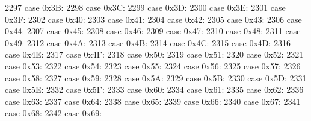 \begin{DoxyCode}
2297                 \textcolor{keywordflow}{case} 0x3B:
2298                 \textcolor{keywordflow}{case} 0x3C:
2299                 \textcolor{keywordflow}{case} 0x3D:
2300                 \textcolor{keywordflow}{case} 0x3E:
2301                 \textcolor{keywordflow}{case} 0x3F:
2302                 \textcolor{keywordflow}{case} 0x40:
2303                 \textcolor{keywordflow}{case} 0x41:
2304                 \textcolor{keywordflow}{case} 0x42:
2305                 \textcolor{keywordflow}{case} 0x43:
2306                 \textcolor{keywordflow}{case} 0x44:
2307                 \textcolor{keywordflow}{case} 0x45:
2308                 \textcolor{keywordflow}{case} 0x46:
2309                 \textcolor{keywordflow}{case} 0x47:
2310                 \textcolor{keywordflow}{case} 0x48:
2311                 \textcolor{keywordflow}{case} 0x49:
2312                 \textcolor{keywordflow}{case} 0x4A:
2313                 \textcolor{keywordflow}{case} 0x4B:
2314                 \textcolor{keywordflow}{case} 0x4C:
2315                 \textcolor{keywordflow}{case} 0x4D:
2316                 \textcolor{keywordflow}{case} 0x4E:
2317                 \textcolor{keywordflow}{case} 0x4F:
2318                 \textcolor{keywordflow}{case} 0x50:
2319                 \textcolor{keywordflow}{case} 0x51:
2320                 \textcolor{keywordflow}{case} 0x52:
2321                 \textcolor{keywordflow}{case} 0x53:
2322                 \textcolor{keywordflow}{case} 0x54:
2323                 \textcolor{keywordflow}{case} 0x55:
2324                 \textcolor{keywordflow}{case} 0x56:
2325                 \textcolor{keywordflow}{case} 0x57:
2326                 \textcolor{keywordflow}{case} 0x58:
2327                 \textcolor{keywordflow}{case} 0x59:
2328                 \textcolor{keywordflow}{case} 0x5A:
2329                 \textcolor{keywordflow}{case} 0x5B:
2330                 \textcolor{keywordflow}{case} 0x5D:
2331                 \textcolor{keywordflow}{case} 0x5E:
2332                 \textcolor{keywordflow}{case} 0x5F:
2333                 \textcolor{keywordflow}{case} 0x60:
2334                 \textcolor{keywordflow}{case} 0x61:
2335                 \textcolor{keywordflow}{case} 0x62:
2336                 \textcolor{keywordflow}{case} 0x63:
2337                 \textcolor{keywordflow}{case} 0x64:
2338                 \textcolor{keywordflow}{case} 0x65:
2339                 \textcolor{keywordflow}{case} 0x66:
2340                 \textcolor{keywordflow}{case} 0x67:
2341                 \textcolor{keywordflow}{case} 0x68:
2342                 \textcolor{keywordflow}{case} 0x69:

\end{DoxyCode}
